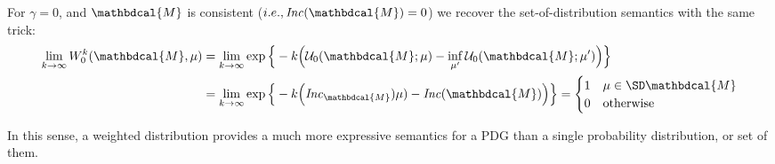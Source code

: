 \documentclass[letterpaper]{article} %
\theoremstyle{plain}
\theoremstyle{definition}
\theoremstyle{remark}
\newcommand{\note}[1]{{\color{blue}\ \!\Large\smash{\textbf{[}}{\normalsize\textsc{note:} #1}\ \!\smash{\textbf{]}}}}
\newcommand{\dg}[1]{\mathbdcal{#1}}
\newcommand\Inc{\mathit{Inc}}
\begin{document}
{For $\gamma = 0$, and $\dg M$ is consistent
($i.e., \Inc(\dg   M) = 0$)
 we recover the set-of-distribution semantics with
          the same trick: 
	\begin{align*}
		 \lim_{k \to \infty} W_0^k(\dg M, \mu)
		&= \lim_{k \to \infty} \exp\Big\{-k \Big(\mathcal U_0(\dg M;\mu) - \inf_{\mu'} \mathcal U_0(\dg M; \mu')\Big) \Big\} \\
		&= \lim_{k \to \infty} \exp\Big\{-k \Big(\Inc_{\dg
                 M})\mu) - \Inc(\dg M)\Big) \Big\}  
		= \begin{cases}
			1 & \mu \in \SD\dg M \\
			0 & \text{otherwise}
		\end{cases} 
	\end{align*}

	In this sense, a weighted distribution provides a much more expressive semantics for a PDG than a single probability distribution, or set of them.
}%
\end{document}
